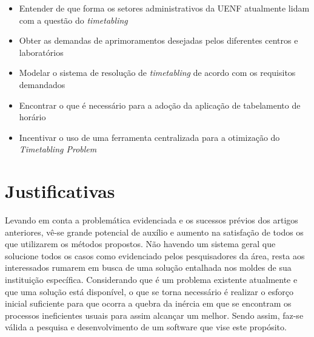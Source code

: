 \begin{itemize}
    \item Entender de que forma os setores administrativos da UENF atualmente lidam com a questão do \textit{timetabling}
    \item Obter as demandas de aprimoramentos desejadas pelos diferentes centros e laboratórios
    \item Modelar o sistema de resolução de \textit{timetabling} de acordo com os requisitos demandados
    \item Encontrar o que é necessário para a adoção da aplicação de tabelamento de horário
    \item Incentivar o uso de uma ferramenta centralizada para a otimização do \textit{Timetabling Problem}
\end{itemize}

\section{Justificativas} %

Levando em conta a problemática evidenciada e os sucessos prévios dos artigos anteriores, vê-se grande potencial de auxílio e aumento na satisfação de todos os que utilizarem os métodos propostos. Não havendo um sistema geral que solucione todos os casos como evidenciado pelos pesquisadores da área, resta aos interessados rumarem em busca de uma solução entalhada nos moldes de sua instituição específica. Considerando que é um problema existente atualmente e que uma solução está disponível, o que se torna necessário é realizar o esforço inicial suficiente para que ocorra a quebra da inércia em que se encontram os processos ineficientes usuais para assim alcançar um melhor. Sendo assim, faz-se válida a pesquisa e desenvolvimento de um software que vise este propósito.


